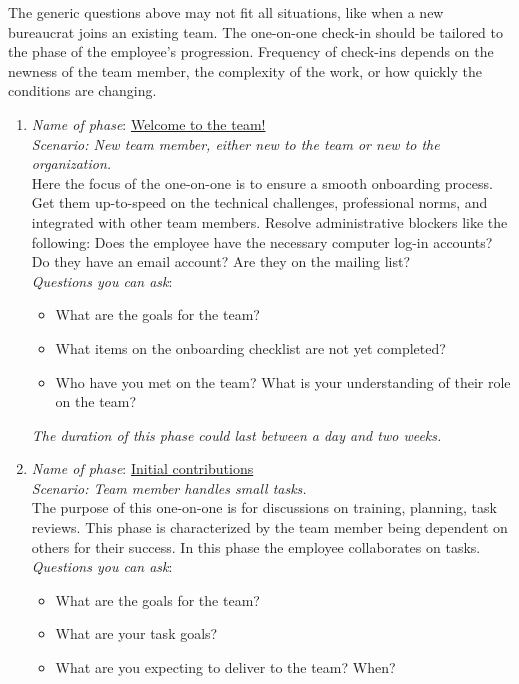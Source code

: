 The generic questions above may not fit all situations, like when a new bureaucrat joins an existing team. 
The one-on-one check-in should be tailored to the phase of the employee's progression. Frequency of check-ins depends on the newness of the team member, the complexity of the work, or how quickly the conditions are changing.
\begin{enumerate}
    \item \textit{Name of phase}: \underline{Welcome to the team!}\\
    \textit{Scenario: New team member, either new to the team or new to the organization. }\\
    Here the focus of the one-on-one is to ensure a smooth onboarding process. Get them up-to-speed on the technical challenges, professional norms, and integrated with other team members. Resolve administrative blockers like the following: Does the employee have the necessary computer log-in accounts? Do they have an email account? Are they on the mailing list? \\
    \textit{Questions you can ask}:
    \begin{itemize}
        \item What are the goals for the team?
        \item What items on the onboarding checklist are not yet completed?
        \item Who have you met on the team? What is your understanding of their role on the team?
    \end{itemize}
\textit{The duration of this phase could last between a day and two weeks.}
    \item \textit{Name of phase}: \underline{Initial contributions}\\
    \textit{Scenario: Team member handles small tasks. }\\
    The purpose of this one-on-one is for discussions on training, planning, task reviews. This phase is characterized by the team member being dependent on others for their success. In this phase the employee collaborates on tasks.\\
    \textit{Questions you can ask}:
    \begin{itemize}
        \item What are the goals for the team?
        \item What are your task goals?
        \item What are you expecting to deliver to the team? When? 

\end{itemize}
\end{enumerate}
